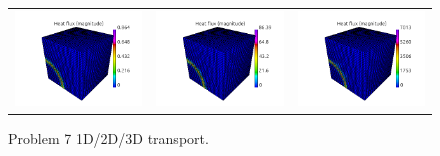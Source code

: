 \documentclass[review]{elsarticle}
\begin{document}
\begin{figure}[tbh]
\begin{center}
\begin{tabular}{ccc}
	  \includegraphics[width=\psize\textwidth]{figs/hflux_p73D1e12.png} &
      \includegraphics[width=\psize\textwidth]{figs/hflux_p73D1e10.png} &
      \includegraphics[width=\psize\textwidth]{figs/hflux_p73D1e8.png} \\
    \end{tabular}
  \caption{
    Problem 7 1D/2D/3D transport.
  }
  \end{center}
  \label{fig:p7_Kn_hflux}
\end{figure}
\end{document}
